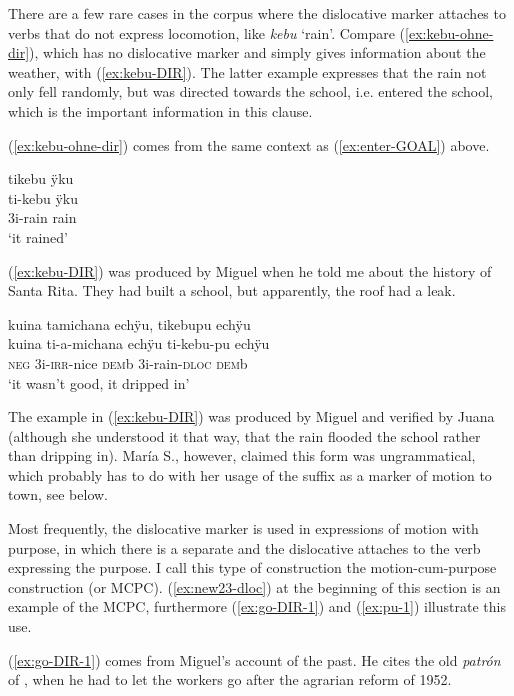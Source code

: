 There are a few rare cases in the corpus where the dislocative marker attaches to verbs that do not express locomotion, like \textit{kebu} ‘rain’. Compare  (\ref{ex:kebu-ohne-dir}), which has no dislocative marker and simply gives information about the weather, with (\ref{ex:kebu-DIR}). The latter example expresses that the rain not only fell randomly, but was directed towards the school, i.e. entered the school, which is the important information in this clause.

(\ref{ex:kebu-ohne-dir}) comes from the same context as (\ref{ex:enter-GOAL}) above.

\newpage
\ea\label{ex:kebu-ohne-dir}
\begingl 
\glpreamble tikebu ÿku\\
\gla ti-kebu ÿku\\ 
\glb 3i-rain rain\\ 
\glft ‘it rained’
\trailingcitation{[jxx-p151016l-2]}
\xe

(\ref{ex:kebu-DIR}) was produced by Miguel when he told me about the history of Santa Rita. They had built a school, but apparently, the roof had a leak. 

\ea\label{ex:kebu-DIR}
\begingl 
\glpreamble kuina tamichana echÿu, tikebupu echÿu\\
\gla kuina ti-a-michana echÿu ti-kebu-pu echÿu\\ 
\glb \textsc{neg} 3i-\textsc{irr}-nice \textsc{dem}b 3i-rain-\textsc{dloc} \textsc{dem}b\\ 
\glft ‘it wasn’t good, it dripped in’
\trailingcitation{[mxx-p110825l.089]}
\xe

The example in (\ref{ex:kebu-DIR}) was produced by Miguel and verified by Juana (although she understood it that way, that the rain flooded the school rather than dripping in). María S., however, claimed this form was ungrammatical, which probably has to do with her usage of the suffix as a marker of motion to town, see below.

Most frequently, the dislocative marker is used in expressions of motion with purpose, in which there is a separate  and the dislocative attaches to the verb expressing the purpose. I call this type of construction the motion-cum-purpose construction  (or MCPC). (\ref{ex:new23-dloc}) at the beginning of this section is an example of the MCPC, furthermore (\ref{ex:go-DIR-1}) and (\ref{ex:pu-1}) illustrate this use.

(\ref{ex:go-DIR-1}) comes from Miguel’s account of the past. He cites the old \textit{patrón} of , when he had to let the workers go after the agrarian reform of 1952.


